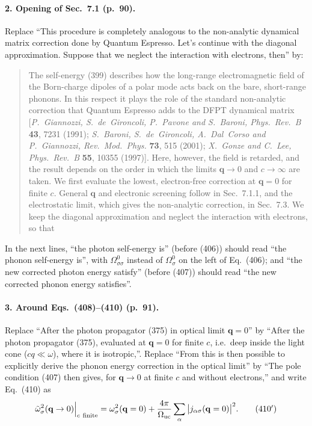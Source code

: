 \documentclass[11pt]{article}
\begin{document}
\paragraph{2. Opening of Sec.~7.1 (p.~90).}
Replace ``This procedure is completely analogous to the non-analytic dynamical matrix correction done by
Quantum Espresso. Let's continue with the diagonal approximation. Suppose that we neglect the interaction
with electrons, then'' by:
\begin{quote}
The self-energy (399) describes how the long-range electromagnetic field of the Born-charge dipoles of a
polar mode acts back on the bare, short-range phonons. In this respect it plays the role of the standard
non-analytic correction that Quantum Espresso adds to the DFPT dynamical matrix [\textit{P.~Giannozzi,
S.~de~Gironcoli, P.~Pavone and S.~Baroni, Phys.\ Rev.\ B} \textbf{43}, 7231 (1991); \textit{S.~Baroni,
S.~de~Gironcoli, A.~Dal~Corso and P.~Giannozzi, Rev.\ Mod.\ Phys.} \textbf{73}, 515 (2001); \textit{X.~Gonze
and C.~Lee, Phys.\ Rev.\ B} \textbf{55}, 10355 (1997)]. Here, however, the field is retarded, and the
result depends on the order in which the limits $\mathbf q\to0$ and $c\to\infty$ are taken. We first
evaluate the lowest, electron-free correction at $\mathbf q=0$ for finite $c$. General $\mathbf q$ and
electronic screening follow in Sec.~7.1.1, and the electrostatic limit, which gives the non-analytic
correction, in Sec.~7.3. We keep the diagonal approximation and neglect the interaction with electrons,
so that
\end{quote}
In the next lines, ``the photon self-energy is'' (before (406)) should read ``the phonon self-energy is'',
with $\Omega^0_{\sigma\sigma}$ instead of $\Omega^0_\sigma$ on the left of Eq.~(406); and ``the new corrected
photon energy satisfy'' (before (407)) should read ``the new corrected phonon energy satisfies''.

\paragraph{3. Around Eqs.~(408)--(410) (p.~91).}
Replace ``After the photon propagator (375) in optical limit $\mathbf q=0$'' by ``After the photon
propagator (375), evaluated at $\mathbf q=0$ for finite $c$, i.e.\ deep inside the light cone
($cq\ll\omega$), where it is isotropic,''. Replace ``From this is then possible to explicitly derive the
phonon energy correction in the optical limit'' by ``The pole condition (407) then gives, for
$\mathbf q\to0$ at finite $c$ and without electrons,'' and write Eq.~(410) as
\begin{equation*}
\tilde\omega^2_\sigma(\mathbf q\to0)\Big|_{c\ \text{finite}}
=\omega^2_\sigma(\mathbf q=0)+\frac{4\pi}{\Omega_{\rm uc}}\sum_\alpha\big|j_{\alpha\sigma}(\mathbf q=0)\big|^2 .
\tag{410$'$}
\end{equation*}
\end{document}
